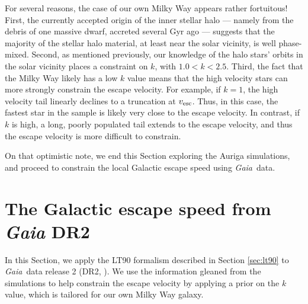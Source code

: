 \documentclass[fleqn,usenatbib]{mnras}
\newcommand{\gaia}		{\emph{Gaia}}
\begin{document}
For several reasons, the case of our own Milky Way appears rather fortuitous! First, the currently accepted origin of the inner stellar halo --- namely from the debris of one massive dwarf, accreted several Gyr ago --- suggests that the majority of the stellar halo material, at least near the solar vicinity, is well phase-mixed. Second, as mentioned previously, our knowledge of the halo stars' orbits  in the solar vicinity places a constraint on $k$, with $1.0 < k < 2.5$. Third,  the fact that the Milky Way likely has a low $k$ value means that the high velocity stars can more strongly constrain the escape velocity. For example, if $k=1$, the high velocity tail linearly declines to a truncation at $v_{\rm esc}$. Thus, in this case, the fastest star in the sample is likely very close to the escape velocity. In contrast, if $k$ is high, a long, poorly populated tail extends to the escape velocity, and thus the escape velocity is more difficult to constrain.

On that optimistic note, we end this Section exploring the Auriga simulations, and proceed to constrain the local Galactic escape speed using \gaia\ data.

\section{The Galactic escape speed from \emph{Gaia} DR2}
\label{sec:gaia}
In this Section, we apply the LT90 formalism described in Section \ref{sec:lt90} to \gaia\ data release 2 (DR2, \citealt{gaia18}). We use the information gleaned from the simulations to help constrain the escape velocity by applying a prior on the $k$ value, which is tailored for our own Milky Way galaxy.
\end{document}
